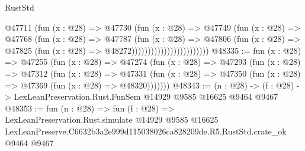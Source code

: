 \begin{lexlean}{RustStd}
\begin{coremodule}
                                    @47711
                                      (fun (x : @28) =>
                                      @47730
                                        (fun (x : @28) =>
                                        @47749
                                          (fun (x : @28) =>
                                          @47768
                                            (fun (x : @28) =>
                                            @47787
                                              (fun (x : @28) =>
                                              @47806
                                                (fun (x : @28) =>
                                                @47825
                                                  (fun (x : @28) => @48272))))))))))))))))))))))))
@48335 := fun (x : @28) =>
  @47255
    (fun (x : @28) =>
    @47274
      (fun (x : @28) =>
      @47293
        (fun (x : @28) =>
        @47312
          (fun (x : @28) =>
          @47331 (fun (x : @28) => @47350 (fun (x : @28) => @47369 (fun (x : @28) => @48320)))))))
@48343 := (n : @28) -> (f : @28) -> LexLeanPreservation.Rust.FunSem @14929 @9585 @16625 @9464 @9467
@48353 := fun (n : @28) =>
  fun (f : @28) =>
  LexLeanPreservation.Rust.simulate
    @14929
    @9585
    @16625
    LexLeanPreserve.C6632b3a2e999d115038026ca828209de.R5.RustStd.crate_ok
    @9464
    @9467
\end{coremodule}
\end{lexlean}
